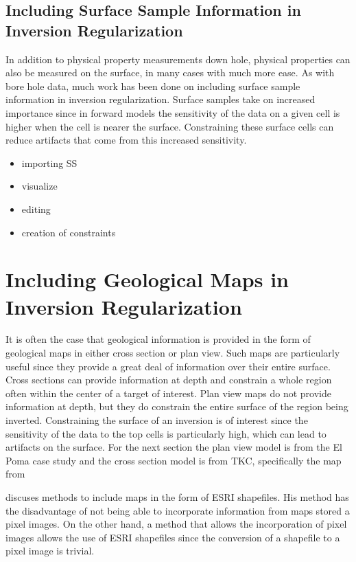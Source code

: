 \subsection{Including Surface Sample Information in Inversion Regularization}
\label{subsec:SS}

In addition to physical property measurements down hole, physical properties can also be measured on the surface, in many cases with much more ease. As with bore hole data, much work  has been done on including surface sample information in inversion regularization. Surface samples take on increased importance since in forward models the sensitivity of the data on a given cell is higher when the cell is nearer the surface. Constraining these surface cells can reduce artifacts that come from this increased sensitivity.

\begin{itemize}
 \item importing SS
 \item visualize
 \item editing 
 \item creation of constraints
\end{itemize}

\section{Including Geological Maps in Inversion Regularization}
\label{sec:maps}

It is often the case that geological information is provided in the form of geological maps in either cross section or plan view. Such maps are particularly useful since they provide a great deal of information over their entire surface. Cross sections can provide information at depth and constrain a whole region often within the center of a target of interest. Plan view maps do not provide information at depth, but they do constrain the entire surface of the region being inverted.  Constraining the surface of an inversion is of interest since the sensitivity of the data to the top cells is particularly high, which can lead to artifacts on the surface. For the next section the plan view model is from the El Poma case study and the cross section model is from TKC, specifically the map from \citep{harder2006geology}

\cite{williams2008geologically} discuses methods to include maps in the form of ESRI shapefiles. His method has the disadvantage of not being able to incorporate information from maps stored a pixel images. On the other hand, a method that allows the incorporation of pixel images allows the use of ESRI shapefiles since the conversion of a shapefile to a pixel image is trivial.

